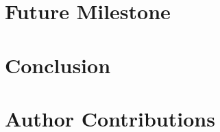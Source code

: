 \documentclass[11pt,letterpaper]{article}
\begin{document}

\section{Future Milestone}
    \label{sec:future}

\section{Conclusion}
    \label{sec:conclusion}

\section*{Author Contributions}
    \label{sec:contributions}
     

\nocite{*}

\end{document}
